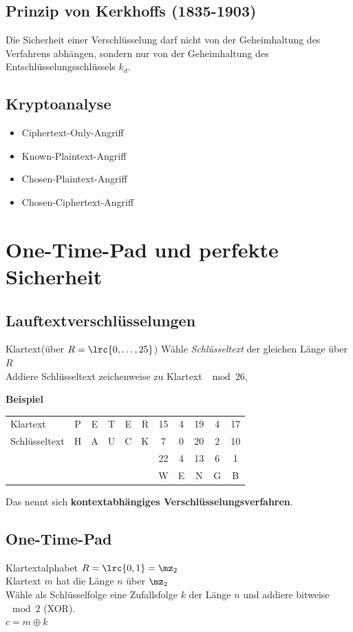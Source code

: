 	\subsection{Prinzip von Kerkhoffs (1835-1903)}
		Die Sicherheit einer Verschlüsselung darf nicht von der Geheimhaltung des Verfahrens abhängen, sondern nur von der Geheimhaltung des Entschlüsselungsschlüssels $k_d$.
	\subsection{Kryptoanalyse}
		\begin{itemize}
			\item Ciphertext-Only-Angriff
			\item Known-Plaintext-Angriff
			\item Chosen-Plaintext-Angriff
			\item Chosen-Ciphertext-Angriff
	\end{itemize}
\section{One-Time-Pad und perfekte Sicherheit}
	\subsection{Lauftextverschlüsselungen}
		Klartext(über $R=\lrc{0,\dots,25}$) Wähle \textit{Schlüsseltext} der gleichen Länge über $R$\\
		Addiere Schlüsseltext zeichenweise zu Klartext $\mod 26$,
		
		\textbf{Beispiel}
		
		\begin{tabular}{lcccccccccc}
			Klartext&P&E&T&E&R&15&4&19&4&17\\
			Schlüsseltext&H&A&U&C&K&7&0&20&2&10\\\cline{7-11}
			&&&&&&22&4&13&6&1\\
			&&&&&&W&E&N&G&B
		\end{tabular}
		
		Das nennt sich \textbf{kontextabhängiges Verschlüsselungsverfahren}.
	\subsection{One-Time-Pad}
		Klartextalphabet $R=\lrc{0,1}=\mz_2$\\
		Klartext $m$ hat die Länge $n$ über $\mz_2$\\
		Wähle als Schlüsselfolge eine Zufallsfolge $k$ der Länge $n$ und addiere bitweise $\mod 2$ (XOR).\\
		$c=m\oplus k$
		
